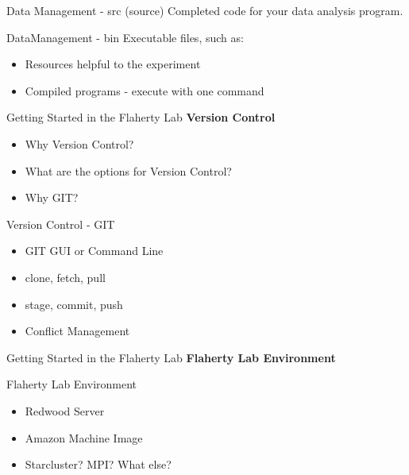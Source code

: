 \documentclass{beamer}
\begin{document}
\begin{frame}{Data Management - src (source)}
	\LARGE{Completed code for your data analysis program.}
\end{frame}

\begin{frame}{DataManagement - bin}
	\LARGE{Executable files, such as:}
		\begin{itemize}
	\item\LARGE{Resources helpful to the experiment}
	\item{Compiled programs - execute with one command}
		\end{itemize}
\end{frame}

\begin{frame}{Getting Started in the Flaherty Lab}
\LARGE\textbf{Version Control}
	\begin{itemize}
  \item\LARGE Why Version Control?
  \item\LARGE What are the options for Version Control?
  \item\LARGE Why GIT?
	\end{itemize}
\end{frame}

\begin{frame}{Version Control - GIT}
	\begin{itemize}
  \item\LARGE{GIT GUI or Command Line}
  \item\LARGE{clone, fetch, pull}
  \item\LARGE{stage, commit, push}
  \item\LARGE{Conflict Management}
	\end{itemize}
\end{frame}

\begin{frame}{Getting Started in the Flaherty Lab}
\LARGE\textbf{Flaherty Lab Environment}
\end{frame}

\begin{frame}{Flaherty Lab Environment}
          \begin{itemize}
  \item\LARGE Redwood Server
  \item\LARGE Amazon Machine Image
  \item\LARGE Starcluster? MPI? What else?
	\end{itemize}
\end{frame}
\end{document}
